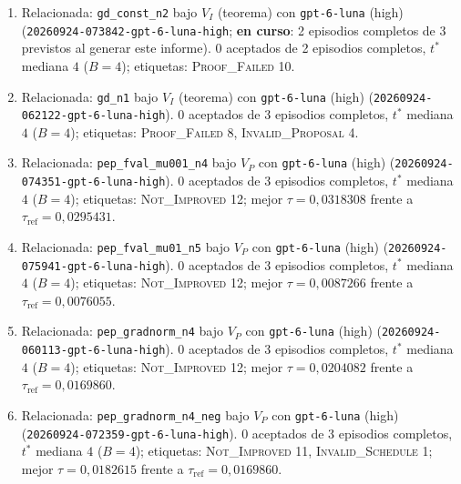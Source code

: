 \documentclass[11pt,a4paper]{article}
\begin{document}
{\begin{enumerate}
  \item Relacionada: \texttt{gd\_\allowbreak{}const\_\allowbreak{}n2} bajo $V_I$ (teorema) con \texttt{gpt-\allowbreak{}6-\allowbreak{}luna} (high) (\texttt{20260924-\allowbreak{}073842-\allowbreak{}gpt-\allowbreak{}6-\allowbreak{}luna-\allowbreak{}high}; \textbf{en curso}: 2 episodios completos de 3 previstos al generar este informe). 0 aceptados de 2 episodios completos, $t^*$ mediana $4$ ($B = 4$); etiquetas: \textsc{Proof\_Failed} 10.
  \item Relacionada: \texttt{gd\_\allowbreak{}n1} bajo $V_I$ (teorema) con \texttt{gpt-\allowbreak{}6-\allowbreak{}luna} (high) (\texttt{20260924-\allowbreak{}062122-\allowbreak{}gpt-\allowbreak{}6-\allowbreak{}luna-\allowbreak{}high}). 0 aceptados de 3 episodios completos, $t^*$ mediana $4$ ($B = 4$); etiquetas: \textsc{Proof\_Failed} 8, \textsc{Invalid\_Proposal} 4.
  \item Relacionada: \texttt{pep\_\allowbreak{}fval\_\allowbreak{}mu001\_\allowbreak{}n4} bajo $V_P$ con \texttt{gpt-\allowbreak{}6-\allowbreak{}luna} (high) (\texttt{20260924-\allowbreak{}074351-\allowbreak{}gpt-\allowbreak{}6-\allowbreak{}luna-\allowbreak{}high}). 0 aceptados de 3 episodios completos, $t^*$ mediana $4$ ($B = 4$); etiquetas: \textsc{Not\_Improved} 12; mejor $\tau = 0{,}0318308$ frente a $\tau_{\mathrm{ref}} = 0{,}0295431$.
  \item Relacionada: \texttt{pep\_\allowbreak{}fval\_\allowbreak{}mu01\_\allowbreak{}n5} bajo $V_P$ con \texttt{gpt-\allowbreak{}6-\allowbreak{}luna} (high) (\texttt{20260924-\allowbreak{}075941-\allowbreak{}gpt-\allowbreak{}6-\allowbreak{}luna-\allowbreak{}high}). 0 aceptados de 3 episodios completos, $t^*$ mediana $4$ ($B = 4$); etiquetas: \textsc{Not\_Improved} 12; mejor $\tau = 0{,}0087266$ frente a $\tau_{\mathrm{ref}} = 0{,}0076055$.
  \item Relacionada: \texttt{pep\_\allowbreak{}gradnorm\_\allowbreak{}n4} bajo $V_P$ con \texttt{gpt-\allowbreak{}6-\allowbreak{}luna} (high) (\texttt{20260924-\allowbreak{}060113-\allowbreak{}gpt-\allowbreak{}6-\allowbreak{}luna-\allowbreak{}high}). 0 aceptados de 3 episodios completos, $t^*$ mediana $4$ ($B = 4$); etiquetas: \textsc{Not\_Improved} 12; mejor $\tau = 0{,}0204082$ frente a $\tau_{\mathrm{ref}} = 0{,}0169860$.
  \item Relacionada: \texttt{pep\_\allowbreak{}gradnorm\_\allowbreak{}n4\_\allowbreak{}neg} bajo $V_P$ con \texttt{gpt-\allowbreak{}6-\allowbreak{}luna} (high) (\texttt{20260924-\allowbreak{}072359-\allowbreak{}gpt-\allowbreak{}6-\allowbreak{}luna-\allowbreak{}high}). 0 aceptados de 3 episodios completos, $t^*$ mediana $4$ ($B = 4$); etiquetas: \textsc{Not\_Improved} 11, \textsc{Invalid\_Schedule} 1; mejor $\tau = 0{,}0182615$ frente a $\tau_{\mathrm{ref}} = 0{,}0169860$.

\end{enumerate}}
\end{document}

